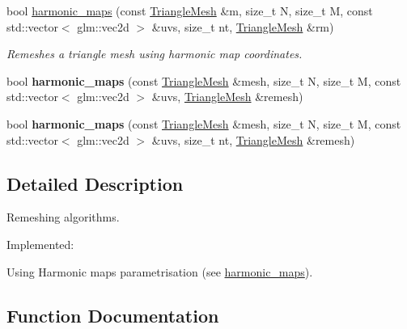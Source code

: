 \begin{DoxyCompactItemize}
bool \hyperlink{namespacegeoproc_1_1remeshing_abc1c5d2c5a934ba9d051129a971a5515}{harmonic\+\_\+maps} (const \hyperlink{classgeoproc_1_1TriangleMesh}{Triangle\+Mesh} \&m, size\+\_\+t N, size\+\_\+t M, const std\+::vector$<$ glm\+::vec2d $>$ \&uvs, size\+\_\+t nt, \hyperlink{classgeoproc_1_1TriangleMesh}{Triangle\+Mesh} \&rm)
\begin{DoxyCompactList}\small\item\em Remeshes a triangle mesh using harmonic map coordinates. \end{DoxyCompactList}\item 
\mbox{\label{namespacegeoproc_1_1remeshing_aef7b7a38ada1b7581989f19fff09b226}} 
bool {\bfseries harmonic\+\_\+maps} (const \hyperlink{classgeoproc_1_1TriangleMesh}{Triangle\+Mesh} \&mesh, size\+\_\+t N, size\+\_\+t M, const std\+::vector$<$ glm\+::vec2d $>$ \&uvs, \hyperlink{classgeoproc_1_1TriangleMesh}{Triangle\+Mesh} \&remesh)
\item 
\mbox{\label{namespacegeoproc_1_1remeshing_a08197201f5951867f5c29c4f37fd77fb}} 
bool {\bfseries harmonic\+\_\+maps} (const \hyperlink{classgeoproc_1_1TriangleMesh}{Triangle\+Mesh} \&mesh, size\+\_\+t N, size\+\_\+t M, const std\+::vector$<$ glm\+::vec2d $>$ \&uvs, size\+\_\+t nt, \hyperlink{classgeoproc_1_1TriangleMesh}{Triangle\+Mesh} \&remesh)
\end{DoxyCompactItemize}


\subsection{Detailed Description}
Remeshing algorithms. 

Implemented\+:
\begin{DoxyItemize}
\item Using Harmonic maps\textquotesingle{} parametrisation (see \hyperlink{namespacegeoproc_1_1remeshing_a5ed68eab2cd304f825321c46cdcdc17e}{harmonic\+\_\+maps}). 
\end{DoxyItemize}

\subsection{Function Documentation}
\mbox{\label{namespacegeoproc_1_1remeshing_a5ed68eab2cd304f825321c46cdcdc17e}} 
